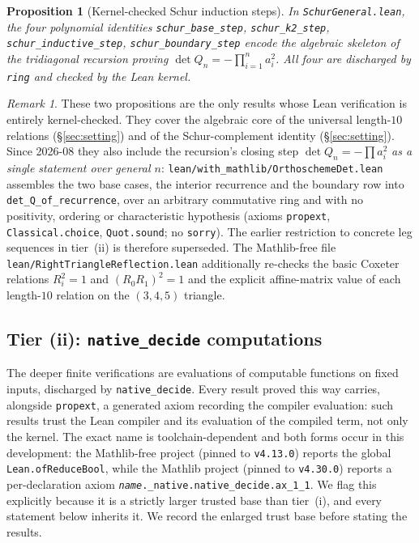 \documentclass[11pt]{article}
\theoremstyle{plain}
\newtheorem{proposition}[theorem]{Proposition}
\theoremstyle{definition}
\theoremstyle{remark}
\newtheorem{remark}[theorem]{Remark}
\begin{document}
\begin{proposition}[Kernel-checked Schur induction steps]
\label{prop:lean-ring-schur}
In \texttt{SchurGeneral.lean}, the four polynomial identities
\texttt{schur\_base\_step}, \texttt{schur\_k2\_step},
\texttt{schur\_inductive\_step}, \texttt{schur\_boundary\_step} encode the
algebraic skeleton of the tridiagonal recursion proving
$\det Q_n = -\prod_{i=1}^{n} a_i^2$. All
four are discharged by \texttt{ring} and checked by the Lean kernel.
\end{proposition}

\begin{remark}
\label{rem:lean-ring-scope}
These two propositions are the only results whose Lean verification is
entirely kernel-checked. They cover the algebraic core of the universal
length-$10$ relations (\S\ref{sec:setting}) and of the Schur-complement
identity (\S\ref{sec:setting}). Since 2026-08 they also include the recursion's closing step
$\det Q_n=-\prod a_i^2$ \emph{as a single statement over general $n$}:
\texttt{lean/with\_mathlib/OrthoschemeDet.lean} assembles the two base cases, the
interior recurrence and the boundary row into
\texttt{det\_Q\_of\_recurrence}, over an arbitrary commutative ring and with no
positivity, ordering or characteristic hypothesis (axioms \texttt{propext},
\texttt{Classical.choice}, \texttt{Quot.sound}; no \texttt{sorry}). The earlier
restriction to concrete leg sequences in tier~(ii) is therefore superseded. The
Mathlib-free file \texttt{lean/RightTriangleReflection.lean} additionally
re-checks the basic Coxeter relations $R_i^2=1$ and $(R_0R_1)^2=1$ and
the explicit affine-matrix value of each length-$10$ relation on the
$(3,4,5)$ triangle.
\end{remark}

\subsection{Tier (ii): \texttt{native\_decide} computations}
\label{ssec:reproduce-native}

The deeper finite verifications are evaluations of computable functions
on fixed inputs, discharged by \texttt{native\_decide}. Every result proved this way
carries, alongside \texttt{propext}, a generated axiom recording the compiler
evaluation: such results
trust the Lean compiler and its evaluation of the compiled term, not only the kernel.
The exact name is toolchain-dependent and both forms occur in this development: the
Mathlib-free project (pinned to \texttt{v4.13.0}) reports the global
\texttt{Lean.ofReduceBool}, while the Mathlib project (pinned to \texttt{v4.30.0})
reports a per-declaration axiom \texttt{\textit{name}.\_native.native\_decide.ax\_1\_1}.
We flag this explicitly because it is a strictly larger trusted base than tier~(i),
and every statement below inherits it. We record the
enlarged trust base before stating the results.
\end{document}
